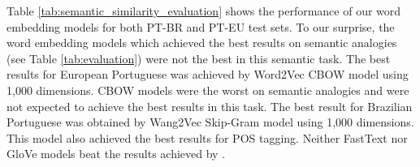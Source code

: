 Table \ref{tab:semantic_similarity_evaluation} shows the performance of our word embedding models for both PT-BR and PT-EU test sets. To our surprise, the word embedding models which achieved the best results on semantic analogies (see Table \ref{tab:evaluation}) were not the best in this semantic task. The best results for European Portuguese was achieved by Word2Vec CBOW model using 1,000 dimensions. CBOW models were the worst on semantic analogies and were not expected to achieve the best results in this task. The best result for Brazilian Portuguese was obtained by Wang2Vec Skip-Gram model using 1,000 dimensions. This model also achieved the best results for POS tagging. Neither FastText nor GloVe models beat the results achieved by \cite{hartmann2016}.

